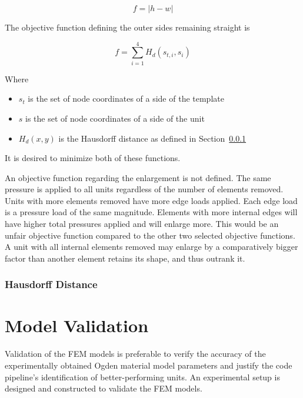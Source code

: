 \begin{equation}
	f=\left | h-w \right |
\end{equation}

The objective function defining the outer sides remaining straight is

\begin{equation}
	f=\sum_{i=1}^{4}H_{d}\left ( s_{t,i},s_{i} \right )
\end{equation}

Where

\begin{itemize}
	\item $s_{t}$ is the set of node coordinates of a side of the template
	\item $s$ is the set of node coordinates of a side of the unit
	\item $H_{d}\left ( x,y \right )$ is the Hausdorff distance as defined in Section~\ref{ssec:Hd}
\end{itemize}

It is desired to minimize both of these functions.

An objective function regarding the enlargement is not defined. The same pressure is applied to all units regardless of the number of elements removed. Units with more elements removed have more edge loads applied. Each edge load is a pressure load of the same magnitude. Elements with more internal edges will have higher total pressures applied and will enlarge more. This would be an unfair objective function compared to the other two selected objective functions. A unit with all internal elements removed may enlarge by a comparatively bigger factor than another element retains its shape, and thus outrank it.

\subsubsection{Hausdorff Distance}
\label{ssec:Hd}

\section{Model Validation}
\label{sec:TP}

Validation of the FEM models is preferable to verify the accuracy of the experimentally obtained Ogden material model parameters and justify the code pipeline's identification of better-performing units. An experimental setup is designed and constructed to validate the FEM models.

